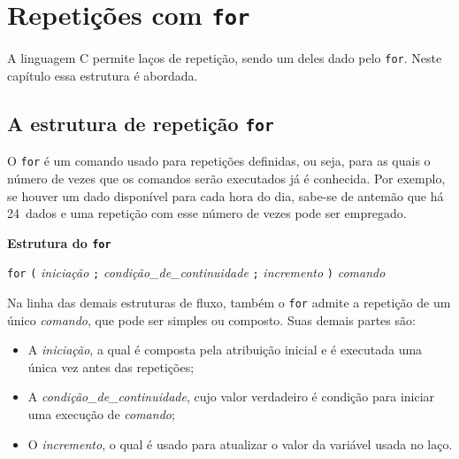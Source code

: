 \documentclass[
  11pt,
  a4paper,
]{scrbook}
\providecommand{\tightlist}{%
  \setlength{\itemsep}{0pt}\setlength{\parskip}{0pt}}\usepackage{longtable,booktabs,array}
\begin{document}
\chapter{\texorpdfstring{Repetições com
\texttt{for}}{Repetições com for}}\label{sec-repeticoes-com-for}

A linguagem C permite laços de repetição, sendo um deles dado pelo
\texttt{for}. Neste capítulo essa estrutura é abordada.

\section{\texorpdfstring{A estrutura de repetição
\texttt{for}}{A estrutura de repetição for}}\label{a-estrutura-de-repetiuxe7uxe3o-for}

O \texttt{for} é um comando usado para repetições definidas, ou seja,
para as quais o número de vezes que os comandos serão executados já é
conhecida. Por exemplo, se houver um dado disponível para cada hora do
dia, sabe-se de antemão que há 24~dados e uma repetição com esse número
de vezes pode ser empregado.


\begin{tcolorbox}[enhanced jigsaw, colback=white, arc=.35mm, colframe=quarto-callout-color-frame, toprule=.15mm, leftrule=.75mm, left=2mm, rightrule=.15mm, bottomrule=.15mm, opacityback=0, breakable]

\vspace{-3mm}\textbf{Estrutura do \texttt{for}}\vspace{3mm}

\texttt{for} \texttt{(} \emph{iniciação} \texttt{;}
\emph{condição\_de\_continuidade} \texttt{;} \emph{incremento}
\texttt{)} \emph{comando}

\end{tcolorbox}

Na linha das demais estruturas de fluxo, também o \texttt{for} admite a
repetição de um único \emph{comando}, que pode ser simples ou composto.
Suas demais partes são:

\begin{itemize}
\tightlist
\item
  A \emph{iniciação}, a qual é composta pela atribuição inicial e é
  executada uma única vez antes das repetições;
\item
  A \emph{condição\_de\_continuidade}, cujo valor verdadeiro é condição
  para iniciar uma execução de \emph{comando};
\item
  O \emph{incremento}, o qual é usado para atualizar o valor da variável
  usada no laço.
\end{itemize}
\end{document}
